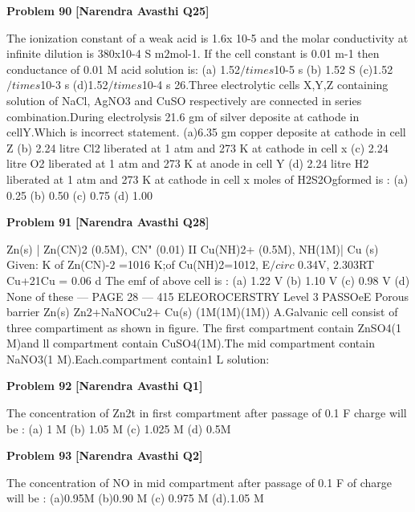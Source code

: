 \begin{problembox}
\textbf{Problem 90} \hfill \textbf{[Narendra Avasthi Q25]}
\label{q:ext-narendra_avasthi_all_questions-90}

The ionization constant of a weak acid is 1.6x 10-5 and the molar conductivity at infinite
dilution is 380x10-4 S m$2$mol-1. If the cell constant is 0.01 m-1 then conductance of 0.01 M
acid solution is:
(a) 1.52$/times$10-5 s
(b) 1.52 S 
(c)1.52$/times$10-3 s
(d)1.52$/times$10-4 s
26.Three electrolytic cells X,Y,Z containing solution of NaCl, AgNO3 and CuSO respectively
are connected in series combination.During electrolysis 21.6 gm of silver deposite at cathode
in cellY.Which is incorrect statement.
(a)6.35 gm copper deposite at cathode in cell Z
(b) 2.24 litre Cl2 liberated at 1 atm and 273 K at cathode in cell x
(c) 2.24 litre O2 liberated at 1 atm and 273 K at anode in cell Y
(d) 2.24 litre H2 liberated at 1 atm and 273 K at cathode in cell x
moles of H2S2Ogformed is :
(a) 0.25
(b) 0.50
(c) 0.75
(d) 1.00
\end{problembox}

\begin{problembox}
\textbf{Problem 91} \hfill \textbf{[Narendra Avasthi Q28]}
\label{q:ext-narendra_avasthi_all_questions-91}

Zn(s) | Zn(CN)2 (0.5M), CN" (0.01) II Cu(NH)2+ (0.5M), NH(1M)| Cu (s)
Given:
K of Zn(CN)-$2$ =1016
K;of Cu(NH)2=1012,
E$/circ$
0.34V, 
2.303RT
Cu+21Cu
= 0.06
d
The emf of above cell is :
(a) 1.22 V
(b) 1.10 V
(c) 0.98 V
(d) None of these
--- PAGE 28 ---
415
ELEOROCERSTRY
Level 3
PASSOeE
Porous
barrier
Zn(s)
Zn2+NaNOCu2+
Cu(s)
(1M(1M)(1M))
A.Galvanic cell consist of three compartiment as shown in figure. The first compartment
contain ZnSO4(1 M)and ll compartment contain CuSO4(1M).The mid compartment
contain NaNO3(1 M).Each.compartment contain1 L solution:
\end{problembox}

\begin{problembox}
\textbf{Problem 92} \hfill \textbf{[Narendra Avasthi Q1]}
\label{q:ext-narendra_avasthi_all_questions-92}

The concentration of Zn2t in first compartment after passage of 0.1 F charge will be :
(a) 1 M
(b) 1.05 M
(c) 1.025 M
(d) 0.5M
\end{problembox}

\begin{problembox}
\textbf{Problem 93} \hfill \textbf{[Narendra Avasthi Q2]}
\label{q:ext-narendra_avasthi_all_questions-93}

The concentration of NO in mid compartment after passage of 0.1 F of charge will be :
(a)0.95M
(b)0.90 M
(c) 0.975 M
(d).1.05 M
\end{problembox}


